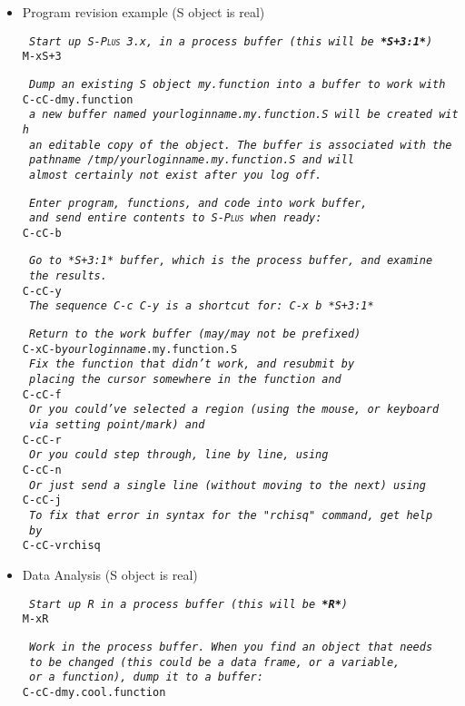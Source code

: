 \documentclass{article}
\newcommand*{\Splus}{\textsc{S-Plus}}
\newcommand*{\Scmt}[1]{\hbox{\qquad {\footnotesize \#\#} \textsl{#1}}}
\newenvironment{Salltt}{\small\begin{alltt}}{\end{alltt}}
\begin{document}
\begin{itemize}
\begin{Salltt}
  \Scmt{edit program, functions, and code in myfile.s, and}
  \Scmt{send revised functions to S when ready with}
  C-c C-f
  \Scmt{or highlighted regions with}
  C-c C-r
  \Scmt{or individual lines with}
  C-c C-n
  \Scmt{or load the entire buffer with} 
  C-c C-l

  \Scmt{save the revised myfile.s when you have finished}
  C-c C-s
  \end{Salltt}

\item Program revision example (S object is real)
  \begin{Salltt}
  \Scmt{Start up \Splus~3.x, in a process buffer (this will be \textbf{*S+3:1*})} 
  M-x S+3

  \Scmt{Dump an existing S object my.function into a buffer to work with}
  C-c C-d my.function
  \Scmt{a new buffer named \textit{yourloginname}.my.function.S will be created with}
  \Scmt{an editable copy of the object.  The buffer is associated with the}
  \Scmt{pathname {\footnotesize /tmp/\textit{yourloginname}.my.function.S} and will}
  \Scmt{almost certainly not exist after you log off.}

  \Scmt{Enter program, functions, and code into work buffer,}
  \Scmt{and send entire contents to \Splus\ when ready:}
  C-c C-b

  \Scmt{Go to *S+3:1* buffer, which is the process buffer, and examine}
  \Scmt{the results.}
  C-c C-y
  \Scmt{The sequence C-c C-y is a shortcut for:  C-x b *S+3:1*}

  \Scmt{Return to the work buffer (may/may not be prefixed)}
  C-x C-b \textit{yourloginname}.my.function.S
  \Scmt{Fix the function that didn't work, and resubmit by}
  \Scmt{placing the cursor somewhere in the function and}
  C-c C-f
  \Scmt{Or you could've selected a region (using the mouse, or keyboard}
  \Scmt{via setting point/mark) and}
  C-c C-r
  \Scmt{Or you could step through, line by line, using}
  C-c C-n
  \Scmt{Or just send a single line (without moving to the next) using}
  C-c C-j
  \Scmt{To fix that error in syntax for the "rchisq" command, get help}
  \Scmt{by}
  C-c C-v rchisq
\end{Salltt}
\item Data Analysis (S object is real)
\begin{Salltt}
  \Scmt{Start up R in a process buffer (this will be \textbf{*R*})} 
  M-x R

  \Scmt{Work in the process buffer.  When you find an object that needs}
  \Scmt{to be changed (this could be a data frame, or a variable,}
  \Scmt{or a function), dump it to a buffer:}
  C-c C-d my.cool.function


\end{Salltt}
\end{itemize}
\end{document}
